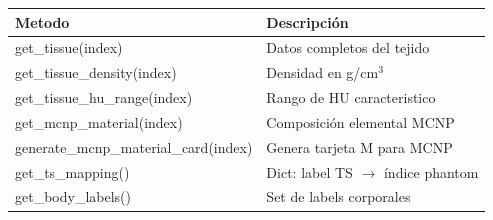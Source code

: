 \documentclass[12pt,a4paper]{article}
\begin{document}
\begin{table}[H]
\centering
\begin{tabular}{l l}
\toprule
\textbf{Metodo} & \textbf{Descripción} \\
\midrule
get\_tissue(index) & Datos completos del tejido \\
get\_tissue\_density(index) & Densidad en g/cm$^3$ \\
get\_tissue\_hu\_range(index) & Rango de HU caracteristico \\
get\_mcnp\_material(index) & Composición elemental MCNP \\
generate\_mcnp\_material\_card(index) & Genera tarjeta M para MCNP \\
get\_ts\_mapping() & Dict: label TS $\to$ índice phantom \\
get\_body\_labels() & Set de labels corporales \\
\bottomrule
\end{tabular}
\end{table}
\end{document}
